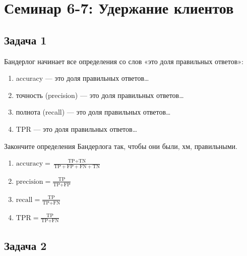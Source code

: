 \documentclass[12pt, a4paper, oneside]{article}
\begin{document}
\section*{Семинар 6-7: Удержание клиентов}

\subsection*{Задача 1}

\begin{problem}
	Бандерлог начинает все определения со слов «это доля правильных ответов»:
	\begin{enumerate}
		\item accuracy — это доля правильных ответов\ldots
		\item точность (precision) — это доля правильных ответов\ldots
		\item полнота (recall) — это доля правильных ответов\ldots
		\item TPR — это доля правильных ответов\ldots
	\end{enumerate}
	
	Закончите определения Бандерлога так, чтобы они были, хм, правильными.
	\begin{sol}
		\begin{enumerate}
			\item $\text{accuracy} = \frac{\text{TP} + \text{TN}}{\text{TP} +\text{FP} +\text{FN} +\text{TN}}$
			\item $\text{precision} = \frac{\text{TP}}{\text{TP} +\text{FP}}$
			\item $\text{recall} = \frac{\text{TP}}{\text{TP} +\text{FN}}$
			\item $\text{TPR} = \frac{\text{TP}}{\text{TP} +\text{FN}}$
		\end{enumerate}
	\end{sol}
\end{problem}

\subsection*{Задача 2}
\end{document}
